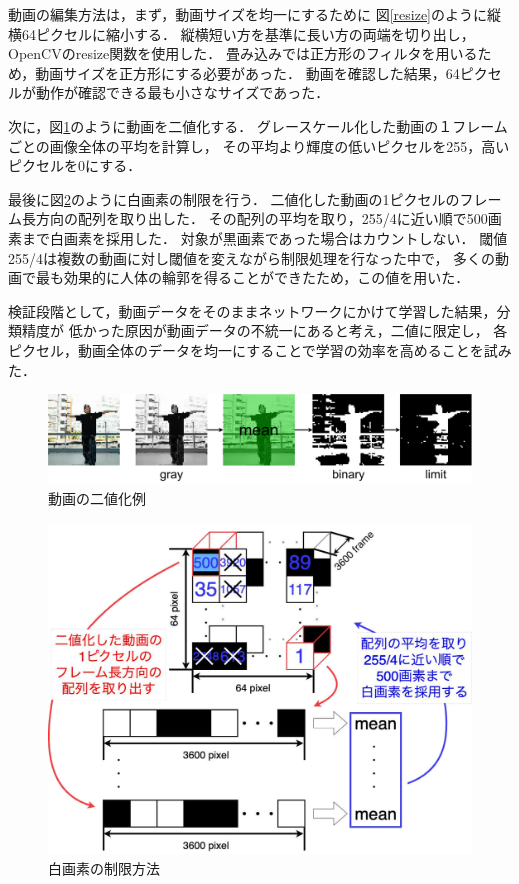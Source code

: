 動画の編集方法は，まず，動画サイズを均一にするために
図\ref{resize}のように縦横64ピクセルに縮小する．
縦横短い方を基準に長い方の両端を切り出し，OpenCVのresize関数\cite{resize}を使用した．
畳み込みでは正方形のフィルタを用いるため，動画サイズを正方形にする必要があった．
動画を確認した結果，64ピクセルが動作が確認できる最も小さなサイズであった．

次に，図\ref{binary}のように動画を二値化する．
グレースケール化した動画の１フレームごとの画像全体の平均を計算し，
その平均より輝度の低いピクセルを255，高いピクセルを0にする．

最後に図\ref{choice}のように白画素の制限を行う．
二値化した動画の1ピクセルのフレーム長方向の配列を取り出した．
その配列の平均を取り，255/4に近い順で500画素まで白画素を採用した．
対象が黒画素であった場合はカウントしない．
閾値255/4は複数の動画に対し閾値を変えながら制限処理を行なった中で，
多くの動画で最も効果的に人体の輪郭を得ることができたため，この値を用いた．

検証段階として，動画データをそのままネットワークにかけて学習した結果，分類精度が
低かった原因が動画データの不統一にあると考え，二値に限定し，
各ピクセル，動画全体のデータを均一にすることで学習の効率を高めることを試みた．

\begin{figure}[b]
  \begin{center}
    \includegraphics[width=120mm]{images/chart/binary.pdf}
  \end{center}
  \caption{動画の二値化例}
  \label{binary}
\end{figure}
\clearpage

\begin{figure}[t]
  \begin{center}
    \includegraphics[width=120mm]{images/chart/choice.pdf}
  \end{center}
  \caption{白画素の制限方法}
  \label{choice}
\end{figure}

